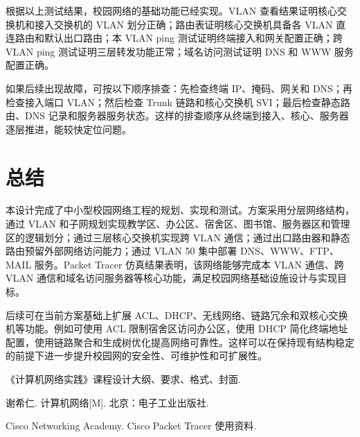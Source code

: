 \documentclass[UTF8,a4paper]{ctexart}
\newenvironment{ReportReferences}{
  \vspace{\baselineskip}
  \noindent\hspace{2em}{\songti\bfseries\zihao{5}参考文献}\par
  \vspace{0.5\baselineskip}
  \begin{enumerate}[label={[\arabic*]}, leftmargin=4em, itemsep=0pt]
}{
  \end{enumerate}
}
\begin{document}
根据以上测试结果，校园网络的基础功能已经实现。VLAN 查看结果证明核心交换机和接入交换机的 VLAN 划分正确；路由表证明核心交换机具备各 VLAN 直连路由和默认出口路由；本 VLAN ping 测试证明终端接入和网关配置正确；跨 VLAN ping 测试证明三层转发功能正常；域名访问测试证明 DNS 和 WWW 服务配置正确。

如果后续出现故障，可按以下顺序排查：先检查终端 IP、掩码、网关和 DNS；再检查接入端口 VLAN；然后检查 Trunk 链路和核心交换机 SVI；最后检查静态路由、DNS 记录和服务器服务状态。这样的排查顺序从终端到接入、核心、服务器逐层推进，能较快定位问题。

\section{总结}

本设计完成了中小型校园网络工程的规划、实现和测试。方案采用分层网络结构，通过 VLAN 和子网规划实现教学区、办公区、宿舍区、图书馆、服务器区和管理区的逻辑划分；通过三层核心交换机实现跨 VLAN 通信；通过出口路由器和静态路由预留外部网络访问能力；通过 VLAN 50 集中部署 DNS、WWW、FTP、MAIL 服务。Packet Tracer 仿真结果表明，该网络能够完成本 VLAN 通信、跨 VLAN 通信和域名访问服务器等核心功能，满足校园网络基础设施设计与实现目标。

后续可在当前方案基础上扩展 ACL、DHCP、无线网络、链路冗余和双核心交换机等功能。例如可使用 ACL 限制宿舍区访问办公区，使用 DHCP 简化终端地址配置，使用链路聚合和生成树优化提高网络可靠性。这样可以在保持现有结构稳定的前提下进一步提升校园网的安全性、可维护性和可扩展性。

\begin{ReportReferences}
  \item 《计算机网络实践》课程设计大纲、要求、格式、封面.
  \item 谢希仁. 计算机网络[M]. 北京：电子工业出版社.
  \item Cisco Networking Academy. Cisco Packet Tracer 使用资料.
\end{ReportReferences}
\end{document}
